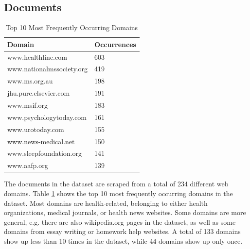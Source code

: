 \subsection{Documents}
\begin{table}[tb]
\centering
\begin{tabular}{ll}
\hline
\textbf{Domain} & \textbf{Occurrences} \\
\hline
www.healthline.com & 603 \\
www.nationalmssociety.org & 419 \\
www.ms.org.au & 198 \\
jhu.pure.elsevier.com & 191 \\
www.msif.org & 183 \\
www.psychologytoday.com & 161 \\
www.urotoday.com & 155 \\
www.news-medical.net & 150 \\
www.sleepfoundation.org & 141 \\
www.aafp.org & 139 \\
\hline
\end{tabular}
\caption{Top 10 Most Frequently Occurring Domains}
\label{tab:top_domains}
\end{table}
The documents in the dataset are scraped from a total of 234 different web domains.
Table \ref{tab:top_domains} shows the top 10 most frequently occurring domains in the dataset.
Most domains are health-related, belonging to either health organizations, medical journals, or health news websites.
Some domains are more general, e.g. there are also wikipedia.org pages in the dataset, as well as some domains from essay writing or homework help websites.
A total of 133 domains show up less than 10 times in the dataset, while 44 domains show up only once.

